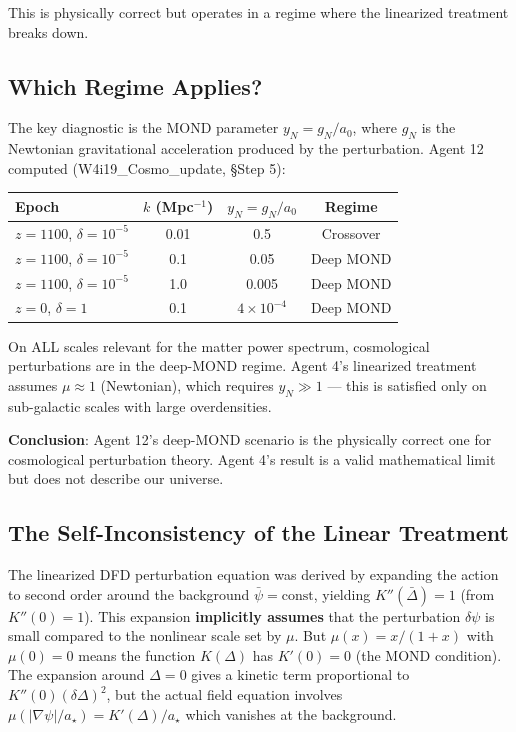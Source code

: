 \documentclass[11pt]{article}
\theoremstyle{definition}
\theoremstyle{remark}
\newcommand{\ee}[1]{\times 10^{#1}}
\newcommand{\astar}{a_\star}
\begin{document}
This is physically correct but operates in a regime where the
linearized treatment breaks down.

\subsection{Which Regime Applies?}

The key diagnostic is the MOND parameter $y_N = g_N/a_0$, where
$g_N$ is the Newtonian gravitational acceleration produced by the
perturbation. Agent 12 computed (W4i19\_Cosmo\_update, \S Step 5):

\begin{center}
\begin{tabular}{lccc}
\toprule
Epoch & $k$ (Mpc$^{-1}$) & $y_N = g_N/a_0$ & Regime \\
\midrule
$z = 1100$, $\delta = 10^{-5}$ & 0.01 & 0.5 & Crossover \\
$z = 1100$, $\delta = 10^{-5}$ & 0.1 & 0.05 & Deep MOND \\
$z = 1100$, $\delta = 10^{-5}$ & 1.0 & 0.005 & Deep MOND \\
$z = 0$, $\delta = 1$ & 0.1 & $4\ee{-4}$ & Deep MOND \\
\bottomrule
\end{tabular}
\end{center}

On ALL scales relevant for the matter power spectrum, cosmological
perturbations are in the deep-MOND regime. Agent 4's linearized
treatment assumes $\mu \approx 1$ (Newtonian), which requires
$y_N \gg 1$ --- this is satisfied only on sub-galactic scales with
large overdensities.

\textbf{Conclusion}: Agent 12's deep-MOND scenario is the physically
correct one for cosmological perturbation theory. Agent 4's result
is a valid mathematical limit but does not describe our universe.

\subsection{The Self-Inconsistency of the Linear Treatment}

The linearized DFD perturbation equation was derived by expanding
the action to second order around the background $\bar\psi = \text{const}$,
yielding $K''(\bar\Delta) = 1$ (from $K''(0) = 1$). This expansion
\textbf{implicitly assumes} that the perturbation $\delta\psi$ is small
compared to the nonlinear scale set by $\mu$. But $\mu(x) = x/(1+x)$
with $\mu(0) = 0$ means the function $K(\Delta)$ has $K'(0) = 0$
(the MOND condition). The expansion around $\Delta = 0$ gives a kinetic
term proportional to $K''(0)(\delta\Delta)^2$, but the actual field
equation involves $\mu(|\nabla\psi|/\astar) = K'(\Delta)/\astar$ which
vanishes at the background.
\end{document}

